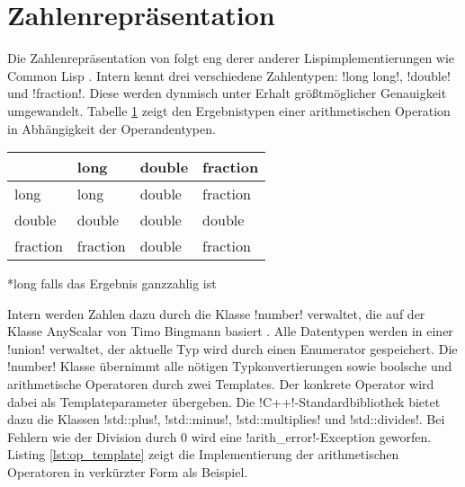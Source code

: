 \section{Zahlenrepräsentation}
\label{sec:numbers}

Die Zahlenrepräsentation von \projectname{} folgt eng derer anderer Lispimplementierungen wie Common Lisp \cite[143 -- 144]{graham_ansi_1995}. Intern kennt \projectname{} drei verschiedene Zahlentypen: !long long!, !double! und !fraction!. Diese werden dynmisch unter Erhalt größtmöglicher Genauigkeit umgewandelt. Tabelle \ref{tab:typeconversion} zeigt den Ergebnistypen einer arithmetischen Operation in Abhängigkeit der Operandentypen.
\begin{table}[htbp]
	\centering
	\begin{threeparttable}
		\begin{tabular*}{0.6\linewidth}{l|lll}
					&long	&double	&fraction\\
			\hline
			long		&long	&double	&fraction\\
			double	&double	&double	&double\\
			fraction	&fraction&double	&fraction\tnote{*}\\
		\end{tabular*}
		\begin{tablenotes}
			\item{*}long falls das Ergebnis ganzzahlig ist
		\end{tablenotes}
		\label{tab:typeconversion}
	\end{threeparttable}
\end{table}
Intern werden Zahlen dazu durch die Klasse !number! verwaltet, die auf der Klasse AnyScalar von Timo Bingmann basiert \cite{anyscalar_online}. Alle Datentypen werden in einer !union! verwaltet, der aktuelle Typ wird durch einen Enumerator gespeichert. Die !number! Klasse übernimmt alle nötigen Typkonvertierungen sowie boolsche und arithmetische Operatoren durch zwei Templates. Der konkrete Operator wird dabei als Templateparameter übergeben. Die !C++!-Standardbibliothek bietet dazu die Klassen !std::plus!, !std::minus!, !std::multiplies! und !std::divides!. Bei Fehlern wie der Division durch $0$ wird eine !arith_error!-Exception geworfen. Listing \ref{lst:op_template} zeigt die Implementierung der arithmetischen Operatoren in verkürzter Form als Beispiel.
